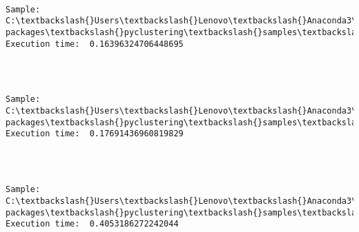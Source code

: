 \documentclass[11pt]{article}
\begin{document}
    \begin{center}
    \end{center}
    { \hspace*{\fill} \\}
    
    \begin{Verbatim}[commandchars=\\\{\}]
Sample:  C:\textbackslash{}Users\textbackslash{}Lenovo\textbackslash{}Anaconda3\textbackslash{}lib\textbackslash{}site-packages\textbackslash{}pyclustering\textbackslash{}samples\textbackslash{}samples\textbackslash{}fcps\textbackslash{}TwoDiamonds.data 		Execution time:  0.16396324706448695 


    \end{Verbatim}

    \begin{center}
    \end{center}
    { \hspace*{\fill} \\}
    
    \begin{Verbatim}[commandchars=\\\{\}]
Sample:  C:\textbackslash{}Users\textbackslash{}Lenovo\textbackslash{}Anaconda3\textbackslash{}lib\textbackslash{}site-packages\textbackslash{}pyclustering\textbackslash{}samples\textbackslash{}samples\textbackslash{}fcps\textbackslash{}WingNut.data 		Execution time:  0.17691436960819829 


    \end{Verbatim}

    \begin{center}
    \end{center}
    { \hspace*{\fill} \\}
    
    \begin{Verbatim}[commandchars=\\\{\}]
Sample:  C:\textbackslash{}Users\textbackslash{}Lenovo\textbackslash{}Anaconda3\textbackslash{}lib\textbackslash{}site-packages\textbackslash{}pyclustering\textbackslash{}samples\textbackslash{}samples\textbackslash{}fcps\textbackslash{}Chainlink.data 		Execution time:  0.4053186272242044 


    \end{Verbatim}
\end{document}
